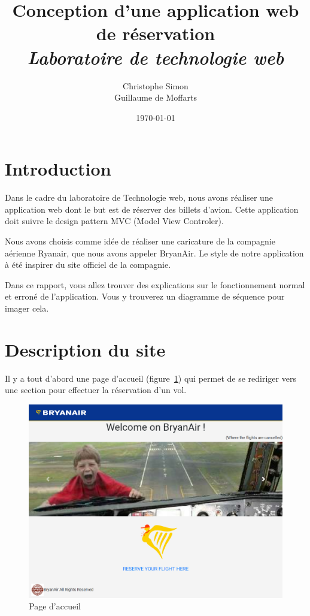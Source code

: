 \documentclass[12pt,a4paper]{article}
\title{Conception d'une application web de réservation\\[3mm] \normalsize{\it Laboratoire de technologie web}}
\author{Christophe Simon \\ Guillaume de Moffarts}
\date{\today}
\begin{document}
	\maketitle
	\section*{Introduction}
		Dans le cadre du laboratoire de Technologie web, nous avons réaliser une application web dont le but est de réserver des billets d'avion. Cette application doit suivre le design pattern MVC (Model View Controler).

		Nous avons choisis comme idée de réaliser une caricature de la compagnie aérienne Ryanair, que nous avons appeler BryanAir. Le style de notre application à été inspirer du site officiel de la compagnie.

		Dans ce rapport, vous allez trouver des explications sur le fonctionnement normal et erroné de l'application. Vous y trouverez un diagramme de séquence pour imager cela.


	\section{Description du site}
		Il y a tout d'abord une page d'accueil (figure~\ref{fig:home}) qui permet de se rediriger vers une section pour effectuer la réservation d'un vol.
		\begin{figure}
			\includegraphics[width=\textwidth]{home.png}
			\caption{Page d'accueil}
			\label{fig:home}
		\end{figure}
\end{document}
